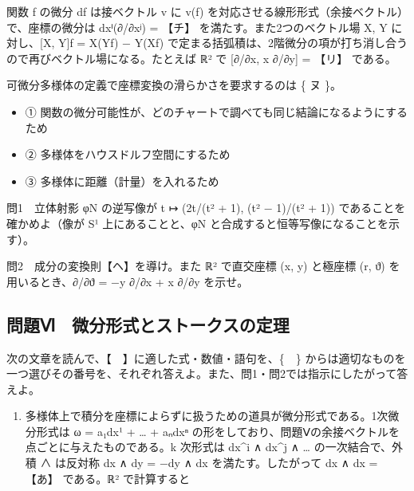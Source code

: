 \documentclass[
  10pt,
  a4paper,
]{article}
\providecommand{\tightlist}{%
  \setlength{\itemsep}{0pt}\setlength{\parskip}{0pt}}
\begin{document}
関数 f の微分 df は接ベクトル v に v(f)
を対応させる線形形式（余接ベクトル）で、座標の微分は
dx{\fallbackfont ⁱ}(∂/∂x{\fallbackfont ʲ}) = 【チ】
を満たす。また2つのベクトル場 X, Y に対し、{[}X, Y{]}f = X(Yf) − Y(Xf)
で定まる括弧積は、2階微分の項が打ち消し合うので再びベクトル場になる。たとえば
{\fallbackfont ℝ}² で {[}∂/∂x, x ∂/∂y{]} = 【リ】 である。

可微分多様体の定義で座標変換の滑らかさを要求するのは \{ ヌ \}。

\begin{itemize}
\tightlist
\item
  ①
  関数の微分可能性が、どのチャートで調べても同じ結論になるようにするため
\item
  ② 多様体をハウスドルフ空間にするため
\item
  ③ 多様体に距離（計量）を入れるため
\end{itemize}

問1　立体射影 φN の逆写像が t {\fallbackfont ↦} (2t/(t² + 1), (t² −
1)/(t² + 1)) であることを確かめよ（像が S¹ 上にあることと、φN
と合成すると恒等写像になることを示す）。

問2　成分の変換則【ヘ】を導け。また {\fallbackfont ℝ}² で直交座標 (x, y)
と極座標 (r, {\fallbackfont ϑ}) を用いるとき、∂/∂{\fallbackfont ϑ} = −y
∂/∂x + x ∂/∂y を示せ。

\hypertarget{ux554fux984cux2175-ux5faeux5206ux5f62ux5f0fux3068ux30b9ux30c8ux30fcux30afux30b9ux306eux5b9aux7406}{%
\subsection{問題Ⅵ　微分形式とストークスの定理}\label{ux554fux984cux2175-ux5faeux5206ux5f62ux5f0fux3068ux30b9ux30c8ux30fcux30afux30b9ux306eux5b9aux7406}}

次の文章を読んで、【　】に適した式・数値・語句を、\{　\}
からは適切なものを一つ選びその番号を、それぞれ答えよ。また、問1・問2では指示にしたがって答えよ。

\begin{enumerate}
\def\labelenumi{(\arabic{enumi})}
\tightlist
\item
  多様体上で積分を座標によらずに扱うための道具が微分形式である。1次微分形式は
  ω = a{\fallbackfont ₁}dx¹ + \ldots{} +
  a{\fallbackfont ₙ}dx{\fallbackfont ⁿ}
  の形をしており、問題Ⅴの余接ベクトルを点ごとに与えたものである。k
  次形式は dx\^{}i ∧ dx\^{}j ∧ \ldots{} の一次結合で、外積 ∧ は反対称 dx
  ∧ dy = −dy ∧ dx を満たす。したがって dx ∧ dx = 【あ】
  である。{\fallbackfont ℝ}² で計算すると
\end{enumerate}
\end{document}
